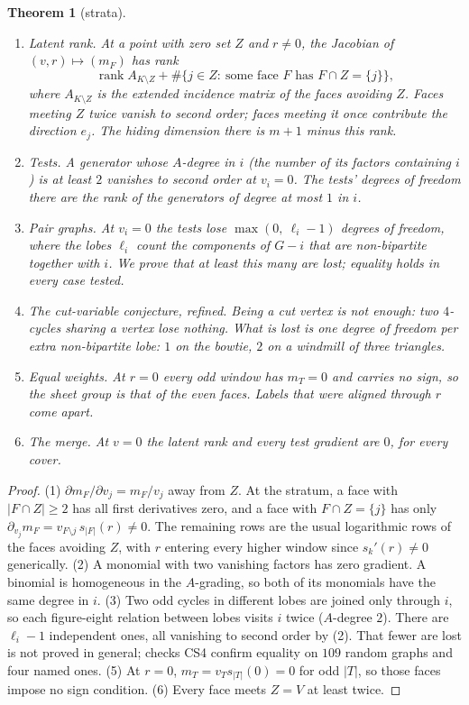 \documentclass[11pt]{article}
\newtheorem{theorem}{Theorem}\newtheorem{proposition}[theorem]{Proposition}\newtheorem{lemma}[theorem]{Lemma}\newtheorem{corollary}[theorem]{Corollary}
\theoremstyle{definition}\newtheorem{definition}[theorem]{Definition}\newtheorem{remark}[theorem]{Remark}\newtheorem{example}[theorem]{Example}
\begin{document}
\begin{theorem}[strata]\label{thm:strata}
\begin{enumerate}
\item[(1)] \emph{Latent rank.} At a point with zero set $Z$ and $r\ne0$, the Jacobian of $(v,r)\mapsto(m_F)$ has rank
\[
\operatorname{rank}A_{K\setminus Z}+\#\{j\in Z:\ \text{some face }F\text{ has }F\cap Z=\{j\}\} ,
\]
  where $A_{K\setminus Z}$ is the extended incidence matrix of the faces avoiding $Z$. Faces meeting $Z$ twice vanish to second order;
  faces meeting it once contribute the direction $e_j$. The hiding dimension there is $m+1$ minus this rank.
\item[(2)] \emph{Tests.} A generator whose $A$-degree in $i$ (the number of its factors containing $i$) is at least $2$ vanishes to
  second order at $v_i=0$. The tests' degrees of freedom there are the rank of the generators of degree at most $1$ in $i$.
\item[(3)] \emph{Pair graphs.} At $v_i=0$ the tests lose $\max(0,\ \ell_i-1)$ degrees of freedom, where the \emph{lobes} $\ell_i$ count
  the components of $G-i$ that are non-bipartite together with $i$. We prove that at least this many are lost; equality holds in every
  case tested.
\item[(4)] \emph{The cut-variable conjecture, refined.} Being a cut vertex is not enough: two $4$-cycles sharing a vertex lose nothing.
  What is lost is one degree of freedom per extra non-bipartite lobe: $1$ on the bowtie, $2$ on a windmill of three triangles.
\item[(5)] \emph{Equal weights.} At $r=0$ every odd window has $m_T=0$ and carries no sign, so the sheet group is that of the even faces.
  Labels that were aligned through $r$ come apart.
\item[(6)] \emph{The merge.} At $v=0$ the latent rank and every test gradient are $0$, for every cover.
\end{enumerate}
\end{theorem}

\begin{proof}
(1) $\partial m_F/\partial v_j=m_F/v_j$ away from $Z$. At the stratum, a face with $|F\cap Z|\ge2$ has all first derivatives zero, and a face
with $F\cap Z=\{j\}$ has only $\partial_{v_j}m_F=v_{F\setminus j}\,s_{|F|}(r)\ne0$. The remaining rows are the usual logarithmic rows of the
faces avoiding $Z$, with $r$ entering every higher window since $s_k'(r)\ne0$ generically. (2) A monomial with two vanishing factors has
zero gradient. A binomial is homogeneous in the $A$-grading, so both of its monomials have the same degree in $i$. (3) Two odd cycles in
different lobes are joined only through $i$, so each figure-eight relation between lobes visits $i$ twice ($A$-degree $2$). There are
$\ell_i-1$ independent ones, all vanishing to second order by (2). That fewer are lost is not proved in general; checks CS4 confirm equality
on $109$ random graphs and four named ones. (5) At $r=0$, $m_T=v_Ts_{|T|}(0)=0$ for odd $|T|$, so those faces impose no sign condition.
(6) Every face meets $Z=V$ at least twice.
\end{proof}
\end{document}
